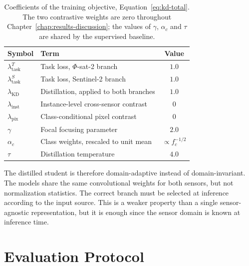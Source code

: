 \begin{table}[htbp]
    \centering
    \begin{tabular}{llc}
        \toprule
        Symbol                        & Term                                   & Value                \\
        \midrule
        $\lambda^{T}_{\mathrm{task}}$ & Task loss, $\Phi$-sat-2 branch         & $1.0$                \\
        $\lambda^{S}_{\mathrm{task}}$ & Task loss, Sentinel-2 branch           & $1.0$                \\
        $\lambda_{\mathrm{KD}}$       & Distillation, applied to both branches & $1.0$                \\
        $\lambda_{\mathrm{inst}}$     & Instance-level cross-sensor contrast   & $0$                  \\
        $\lambda_{\mathrm{pix}}$      & Class-conditional pixel contrast       & $0$                  \\
        \addlinespace
        $\gamma$                      & Focal focusing parameter               & $2.0$                \\
        $\alpha_c$                    & Class weights, rescaled to unit mean   & $\propto f_c^{-1/2}$ \\
        $\tau$                        & Distillation temperature               & $4.0$                \\
        \bottomrule
    \end{tabular}
    \caption[Training Objective Coefficients]{Coefficients of the training objective, Equation~\eqref{eq:kd-total}.
        The two contrastive weights are zero throughout Chapter~\ref{chap:results-discussion}; the values of $\gamma$, $\alpha_c$ and $\tau$ are shared by the supervised baseline.
    }
    \label{tab:loss-weights}
\end{table}

The distilled student is therefore domain-adaptive instead of domain-invariant.
The models share the same convolutional weights for both sensors, but not normalization statistics.
The correct branch must be selected at inference according to the input source.
This is a weaker property than a single sensor-agnostic representation, but it is enough since the sensor domain is known at inference time.

\newpage

\section{Evaluation Protocol}
\label{sec:evaluation-protocol}

